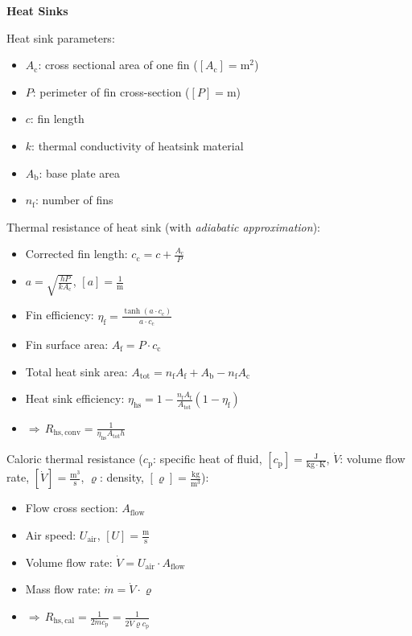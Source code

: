 \documentclass[fontsize=9pt,a4paper,twocolumn]{scrartcl}
\begin{document}
\newpage
\large{\textbf{Heat Sinks}}

Heat sink parameters:
\begin{itemize}
	\item $A_\mathrm{c}$: cross sectional area of one fin ($[A_\mathrm{c}]=\mathrm{m}^2$)
	\item $P$: perimeter of fin cross-section ($[P]=\mathrm{m}$)
	\item $c$: fin length
	\item $k$: thermal conductivity of heatsink material
	\item $A_\mathrm{b}$: base plate area
	\item $n_\mathrm{f}$: number of fins
\end{itemize}

Thermal resistance of heat sink (with \emph{adiabatic approximation}):
\begin{itemize}
	\item Corrected fin length: $c_\mathrm{c} = c + \frac{A_\mathrm{c}}{P}$
	\item $a = \sqrt{\frac{h P}{k A_\mathrm{c}}}$, $[a]=\frac{1}{\mathrm{m}}$
	\item Fin efficiency: $\eta_\mathrm{f} = \frac{\tanh(a\cdot c_\mathrm{c})}{a\cdot c_\mathrm{c}}$
	\item Fin surface area: $A_\mathrm{f} = P\cdot c_\mathrm{c}$
	\item Total heat sink area: $A_\mathrm{tot} = n_\mathrm{f} A_\mathrm{f} + A_\mathrm{b} - n_\mathrm{f} A_\mathrm{c}$
	\item Heat sink efficiency: $\eta_\mathrm{hs} = 1-\frac{n_\mathrm{f} A_\mathrm{f}}{A_\mathrm{tot}} (1-\eta_\mathrm{f})$
	\item $\Rightarrow\,R_{\mathrm{hs},\mathrm{conv}} = \frac{1}{\eta_\mathrm{hs} A_\mathrm{tot} h}$
\end{itemize}

Caloric thermal resistance ($c_\mathrm{p}$: specific heat of fluid, $[c_\mathrm{p}] = \frac{\mathrm{J}}{\mathrm{kg}\cdot\mathrm{K}}$, $\dot V$: volume flow rate, $[\dot V]=\frac{\mathrm{m}^3}{\mathrm{s}}$, $\varrho$: density, $[\varrho]=\frac{\mathrm{kg}}{\mathrm{m}^3}$):
\begin{itemize}
	\item Flow cross section: $A_\mathrm{flow}$
	\item Air speed: $U_\mathrm{air}$, $[U]=\frac{\mathrm{m}}{\mathrm{s}}$
	\item Volume flow rate: $\dot V = U_\mathrm{air}\cdot A_\mathrm{flow}$
	\item Mass flow rate: $\dot m = \dot V\cdot\varrho$
	\item $\Rightarrow\,R_{\mathrm{hs},\mathrm{cal}} = \frac{1}{2 \dot m c_\mathrm{p}} = \frac{1}{2 \dot V \varrho c_\mathrm{p}}$
\end{itemize}
\end{document}
